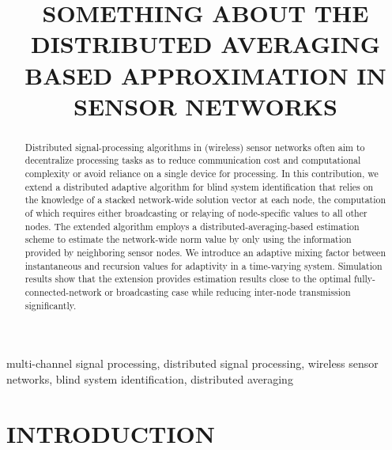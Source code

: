 \documentclass{article}
\title{SOMETHING ABOUT THE DISTRIBUTED AVERAGING BASED APPROXIMATION IN SENSOR NETWORKS}
\begin{document}
\ninept
%
\maketitle
%
\begin{abstract}
    Distributed signal-processing algorithms in (wireless) sensor networks often aim to decentralize processing tasks as to reduce communication cost and computational complexity or avoid reliance on a single device for processing.
    In this contribution, we extend a distributed adaptive algorithm for blind system identification that relies on the knowledge of a stacked network-wide solution vector at each node, the computation of which requires either broadcasting or relaying of node-specific values to all other nodes.
    The extended algorithm employs a distributed-averaging-based estimation scheme to estimate the network-wide norm value by only using the information provided by neighboring sensor nodes.
    We introduce an adaptive mixing factor between instantaneous and recursion values for adaptivity in a time-varying system.
    Simulation results show that the extension provides estimation results close to the optimal fully-connected-network or broadcasting case while reducing inter-node transmission significantly.
\end{abstract}
%
\begin{keywords}
multi-channel signal processing, distributed signal processing, wireless sensor networks, blind system identification, distributed averaging
\end{keywords}
%
\section{INTRODUCTION}
\label{sec:intro}
\end{document}
